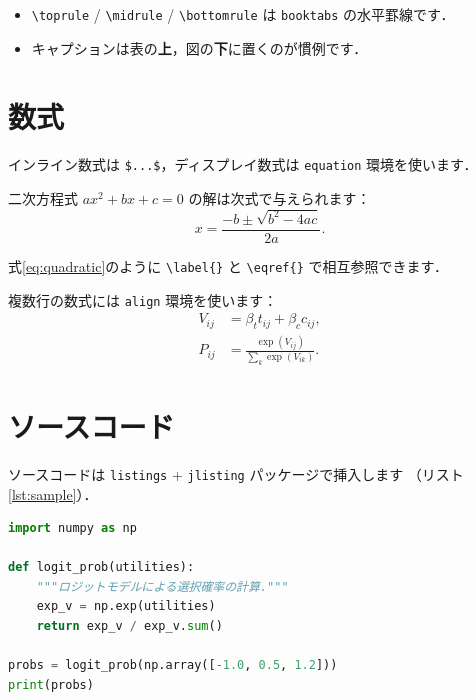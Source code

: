 \begin{itemize}
  \item \verb|\toprule| / \verb|\midrule| / \verb|\bottomrule| は
        \texttt{booktabs} の水平罫線です．
  \item キャプションは表の\textbf{上}，図の\textbf{下}に置くのが慣例です．
\end{itemize}

\section{数式}
\label{sec:math}

インライン数式は \verb|$...$|，ディスプレイ数式は \texttt{equation} 環境を使います．

二次方程式 $ax^2 + bx + c = 0$ の解は次式で与えられます：
\begin{equation}
  x = \frac{-b \pm \sqrt{b^2 - 4ac}}{2a}.
  \label{eq:quadratic}
\end{equation}

式\eqref{eq:quadratic}のように \verb|\label{}| と \verb|\eqref{}| で相互参照できます．

複数行の数式には \texttt{align} 環境を使います：
\begin{align}
  V_{ij} &= \beta_t t_{ij} + \beta_c c_{ij}, \label{eq:utility} \\
  P_{ij} &= \frac{\exp(V_{ij})}{\sum_k \exp(V_{ik})}. \label{eq:logit}
\end{align}

\section{ソースコード}
\label{sec:code}

ソースコードは \texttt{listings} + \texttt{jlisting} パッケージで挿入します
（リスト\ref{lst:sample}）．

\begin{lstlisting}[language=Python, caption={Pythonコードの例}, label={lst:sample}]
import numpy as np

def logit_prob(utilities):
    """ロジットモデルによる選択確率の計算."""
    exp_v = np.exp(utilities)
    return exp_v / exp_v.sum()

probs = logit_prob(np.array([-1.0, 0.5, 1.2]))
print(probs)
\end{lstlisting}

